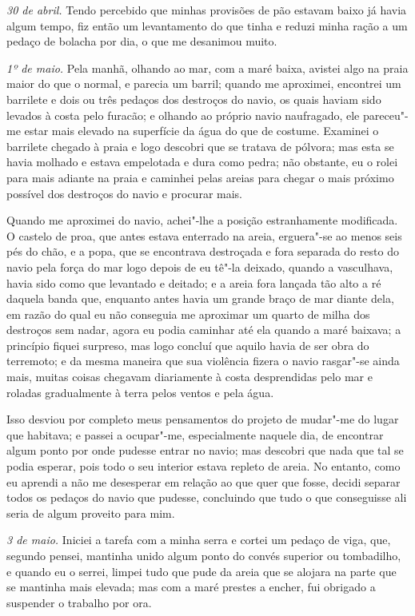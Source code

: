 \emph{30 de abril.} Tendo percebido que minhas provisões de pão estavam
baixo já havia algum tempo, fiz então um levantamento do que tinha e
reduzi minha ração a um pedaço de bolacha por dia, o que me desanimou
muito.

\emph{1º de maio.} Pela manhã, olhando ao mar, com a maré baixa, avistei
algo na praia maior do que o normal, e parecia um barril; quando me
aproximei, encontrei um barrilete e dois ou três pedaços dos destroços
do navio, os quais haviam sido levados à costa pelo furacão; e olhando
ao próprio navio naufragado, ele pareceu"-me estar mais elevado na
superfície da água do que de costume. Examinei o barrilete chegado à
praia e logo descobri que se tratava de pólvora; mas esta se havia
molhado e estava empelotada e dura como pedra; não obstante, eu o rolei
para mais adiante na praia e caminhei pelas areias para chegar o mais
próximo possível dos destroços do navio e procurar mais.

Quando me aproximei do navio, achei"-lhe a posição estranhamente
modificada. O castelo de proa, que antes estava enterrado na areia,
erguera"-se ao menos seis pés do chão, e a popa, que se encontrava
destroçada e fora separada do resto do navio pela força do mar logo
depois de eu tê"-la deixado, quando a vasculhava, havia sido como que
levantado e deitado; e a areia fora lançada tão alto a ré daquela banda
que, enquanto antes havia um grande braço de mar diante dela, em razão
do qual eu não conseguia me aproximar um quarto de milha dos destroços
sem nadar, agora eu podia caminhar até ela quando a maré baixava; a
princípio fiquei surpreso, mas logo concluí que aquilo havia de ser obra
do terremoto; e da mesma maneira que sua violência fizera o navio
rasgar"-se ainda mais, muitas coisas chegavam diariamente à costa
desprendidas pelo mar e roladas gradualmente à terra pelos ventos e pela
água.

Isso desviou por completo meus pensamentos do projeto de mudar"-me do
lugar que habitava; e passei a ocupar"-me, especialmente naquele dia, de
encontrar algum ponto por onde pudesse entrar no navio; mas descobri que
nada que tal se podia esperar, pois todo o seu interior estava repleto
de areia. No entanto, como eu aprendi a não me desesperar em relação ao
que quer que fosse, decidi separar todos os pedaços do navio que
pudesse, concluindo que tudo o que conseguisse ali seria de algum
proveito para mim.

\emph{3 de maio.} Iniciei a tarefa com a minha serra e cortei um pedaço
de viga, que, segundo pensei, mantinha unido algum ponto do convés
superior ou tombadilho, e quando eu o serrei, limpei tudo que pude da
areia que se alojara na parte que se mantinha mais elevada; mas com a
maré prestes a encher, fui obrigado a suspender o trabalho por ora.

